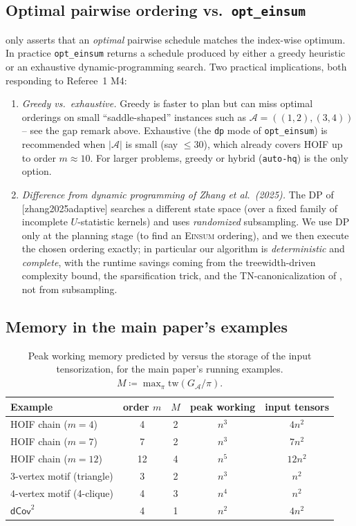\documentclass[11pt]{article}
\newcommand{\Einsum}{\textsc{Einsum}}
\newcommand{\calA}{\mathcal{A}}
\newcommand{\tw}{\mathrm{tw}}
\newcommand{\opteinsum}{\texttt{opt\_einsum}}
\providecommand{\citet}[1]{[#1]}
\theoremstyle{plain}
\theoremstyle{definition}
\begin{document}
\subsection{Optimal pairwise ordering vs.\ \texttt{opt\_einsum}}

 only asserts that an \emph{optimal}
pairwise schedule matches the index-wise optimum.  In practice
\opteinsum{} returns a schedule produced by either a greedy heuristic or
an exhaustive dynamic-programming search.  Two practical implications,
both responding to Referee~1 M4:

\begin{enumerate}[leftmargin=2em]
\item \emph{Greedy vs.\ exhaustive.}  Greedy is faster to plan but can
miss optimal orderings on small ``saddle-shaped'' instances such as
$\calA=((1,2),(3,4))$ -- see the gap remark above.  Exhaustive (the
\texttt{dp} mode of \opteinsum{}) is recommended when $|\calA|$ is small
(say $\leq 30$), which already covers HOIF up to order $m\approx 10$.
For larger problems, greedy or hybrid (\texttt{auto-hq}) is the only
option.
\item \emph{Difference from dynamic programming of Zhang et al.\
(2025).}  The DP of \citet{zhang2025adaptive} searches a different state
space (over a fixed family of incomplete $U$-statistic kernels) and uses
\emph{randomized} subsampling.  We use DP only at the planning stage
(to find an \Einsum{} ordering), and we then execute the chosen
ordering exactly; in particular our algorithm is \emph{deterministic}
and \emph{complete}, with the runtime savings coming from the
treewidth-driven complexity bound, the sparsification trick, and the
TN-canonicalization of \Cref{alg:u-canon}, not from subsampling.
\end{enumerate}

\subsection{Memory in the main paper's examples}

\begin{table}[h]
\centering
\caption{Peak working memory predicted by  versus the
storage of the input tensorization, for the main paper's running examples.
$M\coloneqq\max_\pi \tw(G_\calA/\pi)$.}
\begin{tabular}{lcccc}
\toprule
Example & order $m$ & $M$ & peak working & input tensors \\
\midrule
HOIF chain ($m=4$)            & 4  & 2 & $n^3$    & $4n^2$  \\
HOIF chain ($m=7$)            & 7  & 2 & $n^3$    & $7n^2$  \\
HOIF chain ($m=12$)           & 12 & 4 & $n^5$    & $12n^2$ \\
$3$-vertex motif (triangle)   & 3  & 2 & $n^3$    & $n^2$   \\
$4$-vertex motif (4-clique)   & 4  & 3 & $n^4$    & $n^2$   \\
$\mathsf{dCov}^2$             & 4  & 1 & $n^2$    & $4n^2$  \\
\bottomrule
\end{tabular}
\end{table}
\end{document}
